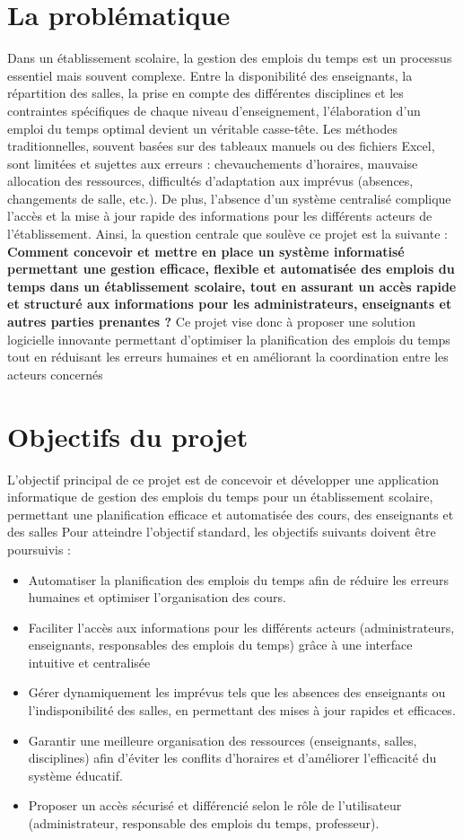 \documentclass[english,12pt,a4paper]{report}
\begin{document}
\section{La problématique}
Dans un établissement scolaire, la gestion des emplois du temps est un processus essentiel mais souvent complexe. Entre la disponibilité des enseignants, la répartition des salles, la prise en compte des différentes disciplines et les contraintes spécifiques de chaque niveau d’enseignement, l’élaboration d’un emploi du temps optimal devient un véritable casse-tête. Les méthodes traditionnelles, souvent basées sur des tableaux manuels ou des fichiers Excel, sont limitées et sujettes aux erreurs : chevauchements d’horaires, mauvaise allocation des ressources, difficultés d’adaptation aux imprévus (absences, changements de salle, etc.). De plus, l’absence d’un système centralisé complique l’accès et la mise à jour rapide des informations pour les différents acteurs de l’établissement. Ainsi, la question centrale que soulève ce projet est la suivante :
\textbf{Comment concevoir et mettre en place un système informatisé permettant une gestion efficace, flexible et automatisée des emplois du temps dans un établissement scolaire, tout en assurant un accès rapide et structuré aux informations pour les administrateurs, enseignants et autres parties prenantes ?} Ce projet vise donc à proposer une solution logicielle innovante permettant d’optimiser la planification des emplois du temps tout en réduisant les erreurs humaines et en améliorant la coordination entre les acteurs concernés

\section{Objectifs du projet }
 L’objectif principal de ce projet est de concevoir et développer une application informatique de gestion des emplois du temps pour un établissement scolaire, permettant une planification efficace et automatisée des cours, des enseignants et des salles
 Pour atteindre l'objectif standard, les objectifs suivants doivent être poursuivis : 
\begin{itemize}
	\item Automatiser la planification des emplois du temps afin de réduire les erreurs humaines et optimiser l’organisation des cours.
	\item Faciliter l’accès aux informations pour les différents acteurs (administrateurs, enseignants, responsables des emplois du temps) grâce à une interface intuitive et centralisée
	\item Gérer dynamiquement les imprévus tels que les absences des enseignants ou l’indisponibilité des salles, en permettant des mises à jour rapides et efficaces.
	\item Garantir une meilleure organisation des ressources (enseignants, salles, disciplines) afin d’éviter les conflits d’horaires et d’améliorer l’efficacité du système éducatif.
	\item Proposer un accès sécurisé et différencié selon le rôle de l’utilisateur (administrateur, responsable des emplois du temps, professeur).
\end{itemize}
\end{document}
